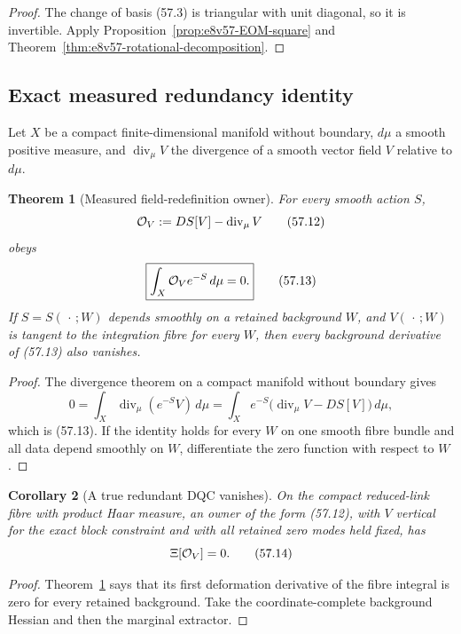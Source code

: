 \documentclass[11pt,oneside]{book}
\newtheorem{theorem}{Theorem}[chapter]
\newtheorem{corollary}[theorem]{Corollary}
\theoremstyle{definition}
\theoremstyle{remark}
\begin{document}
\begin{proof}
The change of basis (57.3) is triangular with unit diagonal, so it
is invertible.  Apply Proposition~\ref{prop:e8v57-EOM-square} and
Theorem~\ref{thm:e8v57-rotational-decomposition}.
\end{proof}

\subsection{Exact measured redundancy identity}

Let \(X\) be a compact finite-dimensional manifold without
boundary, \(d\mu\) a smooth positive measure, and
\(\operatorname{div}_\mu V\) the divergence of a smooth vector
field \(V\) relative to \(d\mu\).

\begin{theorem}[Measured field-redefinition owner]
\label{thm:e8v57-measured-redundancy}
For every smooth action \(S\),
\[
 {\cal O}_V:=DS[V]-\operatorname{div}_\mu V                   \tag{57.12}
\]
obeys
\[
 \boxed{\int_X{\cal O}_V e^{-S}\,d\mu=0.}                    \tag{57.13}
\]
If \(S=S(\,\cdot\,;W)\) depends smoothly on a retained background
\(W\), and \(V(\,\cdot\,;W)\) is tangent to the integration fibre
for every \(W\), then every background derivative of (57.13)
also vanishes.
\end{theorem}

\begin{proof}
The divergence theorem on a compact manifold without boundary
gives
\[
 0=\int_X\operatorname{div}_\mu(e^{-S}V)\,d\mu
 =\int_Xe^{-S}
 \bigl(\operatorname{div}_\mu V-DS[V]\bigr)\,d\mu,
\]
which is (57.13).  If the identity holds for every \(W\) on one
smooth fibre bundle and all data depend smoothly on \(W\),
differentiate the zero function with respect to \(W\).
\end{proof}

\begin{corollary}[A true redundant DQC vanishes]
\label{cor:e8v57-redundant-DQC}
On the compact reduced-link fibre with product Haar measure, an
owner of the form (57.12), with \(V\) vertical for the exact block
constraint and with all retained zero modes held fixed, has
\[
 \Xi[{\cal O}_V]=0.                                          \tag{57.14}
\]
\end{corollary}

\begin{proof}
Theorem~\ref{thm:e8v57-measured-redundancy} says that its first
deformation derivative of the fibre integral is zero for every
retained background.  Take the coordinate-complete background
Hessian and then the marginal extractor.
\end{proof}
\end{document}
